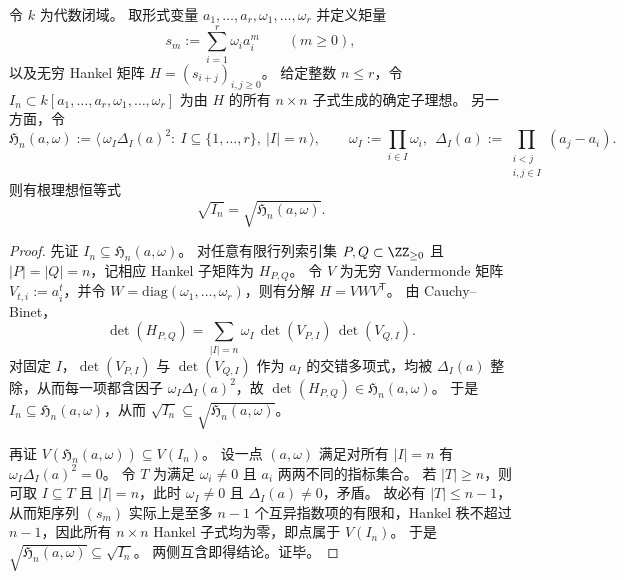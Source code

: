 \begin{theorem}\label{thm:xi-hankel-determinantal-radical-eq-rigidity}
令 \(k\) 为代数闭域。
取形式变量 \(a_1,\dots,a_r,\omega_1,\dots,\omega_r\) 并定义矩量
\[
s_m:=\sum_{i=1}^{r}\omega_i a_i^{m}\qquad(m\ge 0),
\]
以及无穷 Hankel 矩阵 \(H=(s_{i+j})_{i,j\ge 0}\)。
给定整数 \(n\le r\)，令 \(I_n\subset k[a_1,\dots,a_r,\omega_1,\dots,\omega_r]\) 为由 \(H\) 的所有 \(n\times n\) 子式生成的确定子理想。
另一方面，令
\[
\mathfrak H_n(a,\omega):=\big\langle\,\omega_I\Delta_I(a)^2:\ I\subseteq\{1,\dots,r\},\ |I|=n\,\big\rangle,
\qquad
\omega_I:=\prod_{i\in I}\omega_i,\ \ 
\Delta_I(a):=\prod_{\substack{i<j\\ i,j\in I}}(a_j-a_i).
\]
则有根理想恒等式
\[
\sqrt{I_n}=\sqrt{\mathfrak H_n(a,\omega)}.
\]
\end{theorem}
\begin{proof}
先证 \(I_n\subseteq \mathfrak H_n(a,\omega)\)。
对任意有限行列索引集 \(P,Q\subset \ZZ_{\ge 0}\) 且 \(|P|=|Q|=n\)，记相应 Hankel 子矩阵为 \(H_{P,Q}\)。
令 \(V\) 为无穷 Vandermonde 矩阵 \(V_{t,i}:=a_i^{t}\)，并令 \(W=\mathrm{diag}(\omega_1,\dots,\omega_r)\)，则有分解 \(H=V W V^{\mathsf T}\)。
由 Cauchy--Binet，
\[
\det(H_{P,Q})
=\sum_{|I|=n}\omega_I\,\det(V_{P,I})\,\det(V_{Q,I}).
\]
对固定 \(I\)，\(\det(V_{P,I})\) 与 \(\det(V_{Q,I})\) 作为 \(a_I\) 的交错多项式，均被 \(\Delta_I(a)\) 整除，从而每一项都含因子 \(\omega_I\Delta_I(a)^2\)，故 \(\det(H_{P,Q})\in \mathfrak H_n(a,\omega)\)。
于是 \(I_n\subseteq \mathfrak H_n(a,\omega)\)，从而 \(\sqrt{I_n}\subseteq \sqrt{\mathfrak H_n(a,\omega)}\)。
\par
再证 \(V(\mathfrak H_n(a,\omega))\subseteq V(I_n)\)。
设一点 \((a,\omega)\) 满足对所有 \(|I|=n\) 有 \(\omega_I\Delta_I(a)^2=0\)。
令 \(T\) 为满足 \(\omega_i\neq 0\) 且 \(a_i\) 两两不同的指标集合。
若 \(|T|\ge n\)，则可取 \(I\subseteq T\) 且 \(|I|=n\)，此时 \(\omega_I\neq 0\) 且 \(\Delta_I(a)\neq 0\)，矛盾。
故必有 \(|T|\le n-1\)，从而矩序列 \((s_m)\) 实际上是至多 \(n-1\) 个互异指数项的有限和，Hankel 秩不超过 \(n-1\)，因此所有 \(n\times n\) Hankel 子式均为零，即点属于 \(V(I_n)\)。
于是 \(\sqrt{\mathfrak H_n(a,\omega)}\subseteq \sqrt{I_n}\)。
两侧互含即得结论。证毕。
\end{proof}

